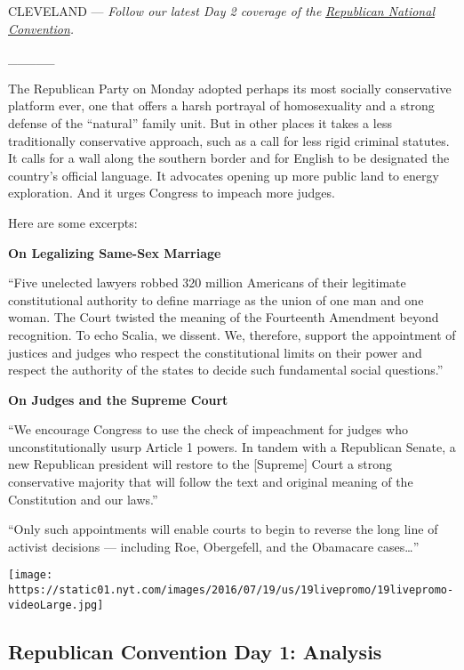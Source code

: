 CLEVELAND --- \emph{Follow our latest Day 2 coverage of the}
\href{http://www.nytimes.com/2016/07/20/us/politics/republican-national-convention.html}{\emph{Republican
National Convention}}\emph{.}

\_\_\_\_\_

The Republican Party on Monday adopted perhaps its most socially
conservative platform ever, one that offers a harsh portrayal of
homosexuality and a strong defense of the ``natural'' family unit. But
in other places it takes a less traditionally conservative approach,
such as a call for less rigid criminal statutes. It calls for a wall
along the southern border and for English to be designated the country's
official language. It advocates opening up more public land to energy
exploration. And it urges Congress to impeach more judges.

Here are some excerpts:

\textbf{On Legalizing Same-Sex Marriage}

``Five unelected lawyers robbed 320 million Americans of their
legitimate constitutional authority to define marriage as the union of
one man and one woman. The Court twisted the meaning of the Fourteenth
Amendment beyond recognition. To echo Scalia, we dissent. We, therefore,
support the appointment of justices and judges who respect the
constitutional limits on their power and respect the authority of the
states to decide such fundamental social questions.''

\textbf{On Judges and the Supreme Court}

``We encourage Congress to use the check of impeachment for judges who
unconstitutionally usurp Article 1 powers. In tandem with a Republican
Senate, a new Republican president will restore to the {[}Supreme{]}
Court a strong conservative majority that will follow the text and
original meaning of the Constitution and our laws.''

``Only such appointments will enable courts to begin to reverse the long
line of activist decisions --- including Roe, Obergefell, and the
Obamacare cases\ldots{}''

\href{https://www.nytimes.com/interactive/2016/07/18/us/elections/gop-conventions-speakers.html}{}

\texttt{[image: https://static01.nyt.com/images/2016/07/19/us/19livepromo/19livepromo-videoLarge.jpg]}

\hypertarget{republican-convention-day-1-analysis}{%
\subsection{Republican Convention Day 1:
Analysis}\label{republican-convention-day-1-analysis}}

